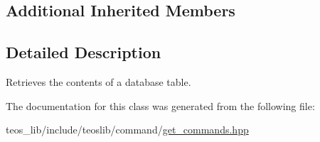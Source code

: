 \subsection*{Additional Inherited Members}


\subsection{Detailed Description}
Retrieves the contents of a database table. 

The documentation for this class was generated from the following file\+:\begin{DoxyCompactItemize}
\item 
teos\+\_\+lib/include/teoslib/command/\mbox{\hyperlink{get__commands_8hpp}{get\+\_\+commands.\+hpp}}\end{DoxyCompactItemize}
